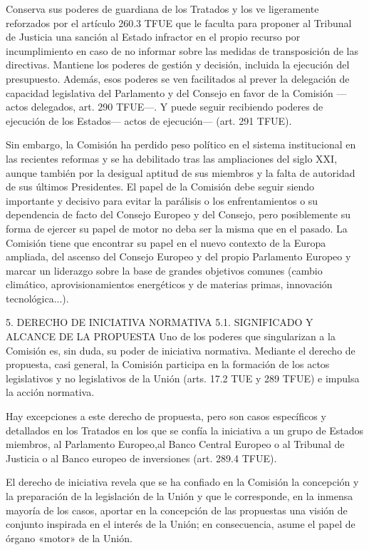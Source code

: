 \documentclass[10pt,a4paper]{article}
\begin{document}
Conserva sus poderes de guardiana de los Tratados y los ve ligeramente reforzados por el artículo 260.3 TFUE que le faculta para proponer al Tribunal de Justicia una sanción al Estado infractor en el propio recurso por incumplimiento en caso de no informar sobre las medidas de transposición de las directivas. Mantiene los poderes de gestión y decisión, incluida la ejecución del presupuesto. Además, esos poderes se ven facilitados al prever la delegación de capacidad legislativa del Parlamento y del Consejo en favor de la Comisión —actos delegados, art. 290 TFUE—. Y puede seguir recibiendo poderes de ejecución de los Estados— actos de ejecución— (art. 291 TFUE).

Sin embargo, la Comisión ha perdido peso político en el sistema institucional en las recientes reformas y se ha debilitado tras las ampliaciones del siglo XXI, aunque también por la desigual aptitud de sus miembros y la falta de autoridad de sus últimos Presidentes. El papel de la Comisión debe seguir siendo importante y decisivo para evitar la parálisis o los enfrentamientos o su dependencia de facto del Consejo Europeo y del Consejo, pero posiblemente su forma de ejercer su papel de motor no deba ser la misma que en el pasado. La Comisión tiene que encontrar su papel en el nuevo  contexto de la Europa ampliada, del ascenso del Consejo Europeo y del propio Parlamento Europeo y marcar un liderazgo sobre la base de grandes objetivos comunes (cambio climático, aprovisionamientos energéticos y de materias primas, innovación tecnológica...).

5. DERECHO DE INICIATIVA NORMATIVA
5.1. SIGNIFICADO Y ALCANCE DE LA PROPUESTA
Uno de los poderes que singularizan a la Comisión es, sin duda, su poder de iniciativa normativa. Mediante el derecho de propuesta, casi general, la Comisión participa en la formación de los actos legislativos y no legislativos de la Unión (arts. 17.2 TUE y 289 TFUE) e impulsa la acción normativa. 

Hay excepciones a este derecho de propuesta, pero son casos  específicos y detallados en los Tratados en los que se confía la iniciativa a un grupo de Estados miembros, al Parlamento Europeo,al Banco Central Europeo o al Tribunal de Justicia o al Banco europeo de inversiones (art. 289.4 TFUE).

El derecho de iniciativa revela que se ha confiado en la Comisión la concepción y la preparación de la legislación de la Unión y que le corresponde, en la inmensa mayoría de los casos, aportar en la concepción de las propuestas una visión de conjunto inspirada en el interés de la Unión; en consecuencia, asume el papel de órgano «motor» de la Unión.
\end{document}
